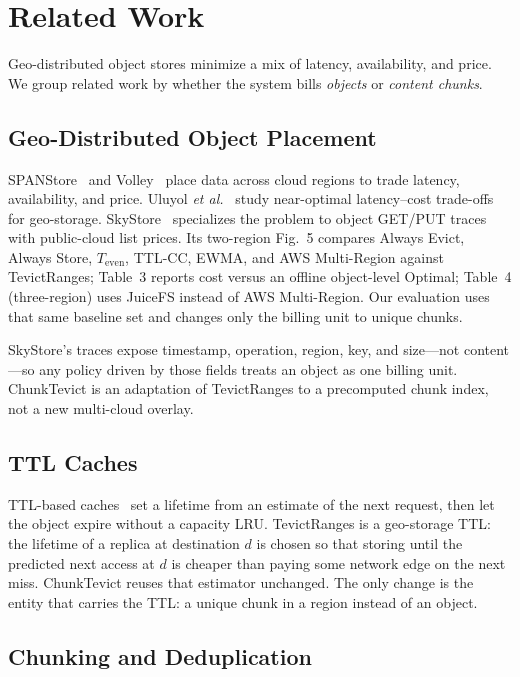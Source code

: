 \section{Related Work}
\label{sec:related}

Geo-distributed object stores minimize a mix of latency, availability, and price.
We group related work by whether the system bills \emph{objects} or \emph{content chunks}.

\subsection{Geo-Distributed Object Placement}

SPANStore~\cite{spanstore2013} and Volley~\cite{volley2010} place data across cloud regions to trade latency, availability, and price.
Uluyol \emph{et al.}~\cite{uluyol2020} study near-optimal latency--cost trade-offs for geo-storage.
SkyStore~\cite{skystore2025} specializes the problem to object {GET}/{PUT} traces with public-cloud list prices.
Its two-region Fig.~5 compares Always Evict, Always Store, $T_{\mathrm{even}}$, {TTL}-{CC}, {EWMA}, and {AWS} Multi-Region against TevictRanges; Table~3 reports cost versus an offline object-level Optimal; Table~4 (three-region) uses JuiceFS instead of {AWS} Multi-Region.
Our evaluation uses that same baseline set and changes only the billing unit to unique chunks.

SkyStore's traces expose timestamp, operation, region, key, and size---not content---so any policy driven by those fields treats an object as one billing unit.
ChunkTevict is an adaptation of TevictRanges to a precomputed chunk index, not a new multi-cloud overlay.

\subsection{{TTL} Caches}

{TTL}-based caches~\cite{ttl_cc2019} set a lifetime from an estimate of the next request, then let the object expire without a capacity {LRU}.
TevictRanges is a geo-storage {TTL}: the lifetime of a replica at destination $d$ is chosen so that storing until the predicted next access at $d$ is cheaper than paying some network edge on the next miss.
ChunkTevict reuses that estimator unchanged.
The only change is the entity that carries the {TTL}: a unique chunk in a region instead of an object.

\subsection{Chunking and Deduplication}

